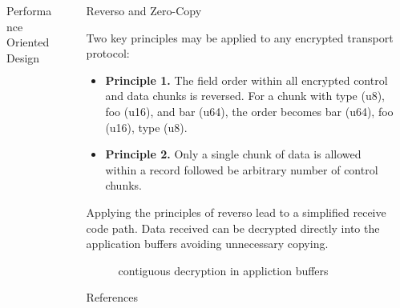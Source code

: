 \documentclass[final]{beamer}
\newlength{\sepwidth}
\newlength{\colwidth}
\newcommand{\separatorcolumn}{\begin{column}{\sepwidth}\end{column}}
\begin{document}
\begin{frame}[t]
\begin{columns}[t]
\begin{column}{\colwidth}
\begin{block}{Performance Oriented Design}
        \end{block}

      \end{column}

      \separatorcolumn

      \begin{column}{\colwidth}

        \begin{block}{Reverso and Zero-Copy}

          Two key principles may be applied to any encrypted transport protocol:

          \begin{itemize}
            \item \textbf{Principle 1.} The field order within all encrypted control and data chunks is reversed.
            For a chunk with type (u8), foo (u16), and bar (u64), the order becomes bar (u64), foo (u16), type (u8).
            \item \textbf{Principle 2.} Only a single chunk of data is allowed within a record followed be arbitrary
            number of control chunks.
          \end{itemize}
          Applying the principles of reverso lead to a simplified receive code path.
          Data received can be decrypted directly into the application buffers avoiding unnecessary copying.
          \begin{figure}
            \centering
            
            \caption{contiguous decryption in appliction buffers}
            \label{fig:zero-copy}
          \end{figure}
        \end{block}


        \begin{block}{References}

          \nocite{*}
          \footnotesize{}

        \end{block}

      \end{column}

      \separatorcolumn
    \end{columns}
  \end{frame}
\end{document}
